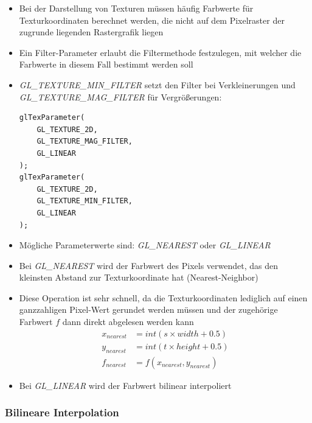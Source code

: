 \documentclass{scrartcl}
\begin{document}
\begin{itemize}
	\item Bei der Darstellung von Texturen müssen häufig Farbwerte für Texturkoordinaten berechnet werden, die nicht auf dem Pixelraster der zugrunde liegenden Rastergrafik liegen
	\item Ein Filter-Parameter erlaubt die Filtermethode festzulegen, mit welcher die Farbwerte in diesem Fall bestimmt werden soll
	\item \textit{GL\_TEXTURE\_MIN\_FILTER} setzt den Filter bei Verkleinerungen und \\
	\textit{GL\_TEXTURE\_MAG\_FILTER} für Vergrößerungen:
	\begin{lstlisting}
glTexParameter(
	GL_TEXTURE_2D,
	GL_TEXTURE_MAG_FILTER,
	GL_LINEAR
);
glTexParameter(
	GL_TEXTURE_2D,
	GL_TEXTURE_MIN_FILTER,
	GL_LINEAR
);
	\end{lstlisting}
	\item Mögliche Parameterwerte sind: \textit{GL\_NEAREST} oder \textit{GL\_LINEAR}
	\item Bei \textit{GL\_NEAREST} wird der Farbwert des Pixels verwendet, das den kleinsten Abstand zur Texturkoordinate hat (Nearest-Neighbor)
	\item Diese Operation ist sehr schnell, da die Texturkoordinaten lediglich auf einen ganzzahligen Pixel-Wert gerundet werden müssen und der zugehörige Farbwert $f$ dann direkt abgelesen werden kann
	\begin{equation}
		\begin{split}
			x_{nearest} &= int(s \times width + 0.5) \\
			y_{nearest} &= int(t \times height + 0.5) \\
			f_{nearest} &= f(x_{nearest}, y_{nearest})
		\end{split}
	\end{equation}
	\item Bei \textit{GL\_LINEAR} wird der Farbwert bilinear interpoliert
\end{itemize}

\subsubsection{Bilineare Interpolation}
\end{document}
